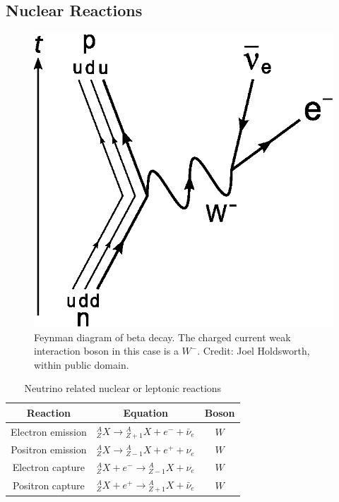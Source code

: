 \documentclass{sciposter}
\begin{document}
\begin{multicols}{3}
\subsection{Nuclear Reactions}


\begin{figure}[h]
\centering
\includegraphics[width=\columnwidth]{assets/Beta_Negative_Decay.eps}
\caption{Feynman diagram of beta decay. The charged current weak interaction boson in this case is a $W^-$. Credit: Joel Holdsworth, within public domain.}
\label{fig:Beta_Negative_Decay}
\end{figure}





\begin{table}[ht]
\centering
\caption{Neutrino related nuclear or leptonic reactions}
 \begin{tabular}{|c | c | c|}
 \hline
 Reaction & Equation & Boson   \\ [0.5ex]
 \hline
 Electron emission & ${}^A_Z X \to {}^A_{Z+1}X + e^- +\bar \nu_e$ & $W$  \\
 Positron emission & ${}^A_Z X \to {}^A_{Z-1}X + e^+ + \nu_e$ & $W$  \\
 Electron capture & ${}^A_Z X + e^- \to {}^A_{Z-1}X  + \nu_e$ &  $W$ \\
 Positron capture & ${}^A_Z X + e^+ \to {}^A_{Z+1}X  + \bar\nu_e$ &  $W$ \\
 [0.5ex]
 \hline


\end{tabular}
\end{table}
\end{multicols}
\end{document}
